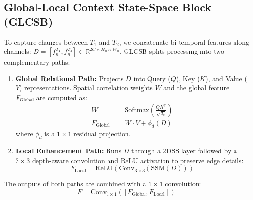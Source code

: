 \documentclass[final,5p,times,twocolumn]{elsarticle}
\begin{document}
\subsection{Global-Local Context State-Space Block (GLCSB)}
To capture changes between $T_1$ and $T_2$, we concatenate bi-temporal features along channels: $D = [f^{T_1}_n, f^{T_2}_n] \in \mathbb{R}^{2C \times H_n \times W_n}$. GLCSB splits processing into two complementary paths:
\begin{enumerate}
    \item \textbf{Global Relational Path:} Projects $D$ into Query ($Q$), Key ($K$), and Value ($V$) representations. Spatial correlation weights $W$ and the global feature $F_{\text{Global}}$ are computed as:
    \begin{align}
        W &= \text{Softmax}\left(\frac{QK^\top}{\sqrt{d_k}}\right) \\
        F_{\text{Global}} &= W \cdot V + \phi_d(D)
    \end{align}
    where $\phi_d$ is a $1\times1$ residual projection.
    \item \textbf{Local Enhancement Path:} Runs $D$ through a 2DSS layer followed by a $3\times3$ depth-aware convolution and ReLU activation to preserve edge details:
    \begin{equation}
        F_{\text{Local}} = \text{ReLU}\left(\text{Conv}_{3\times3}(\text{SSM}(D))\right)
    \end{equation}
\end{enumerate}
The outputs of both paths are combined with a $1\times1$ convolution:
\begin{equation}
    F = \text{Conv}_{1\times1}\left([F_{\text{Global}}, F_{\text{Local}}]\right)
\end{equation}
\end{document}
